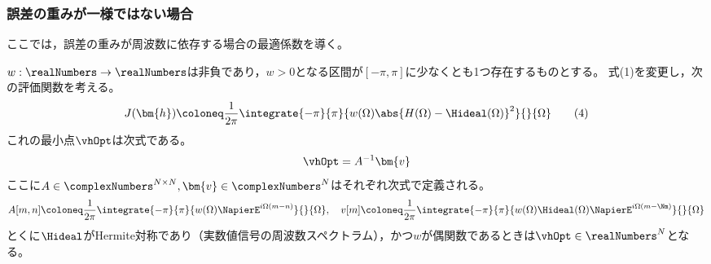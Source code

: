         \subsubsection{誤差の重みが一様ではない場合}
            ここでは，誤差の重みが周波数に依存する場合の最適係数を導く。
            \begin{shadebox}
                $w:\realNumbers\to\realNumbers$は非負であり，$w>0$となる区間が$[-\pi,\pi]$に少なくとも1つ存在するものとする。
                式(1)を変更し，次の評価関数を考える。
                \[ J(\bm{h}) \coloneq \frac{1}{2\pi}\integrate{-\pi}{\pi}{w(\Omega)\abs{H(\Omega)-\Hideal(\Omega)}^2}{}{\Omega}\tag{4} \]
                これの最小点$\vhOpt$は次式である。
                \[ \vhOpt = A^{-1}\bm{v} \]
                ここに$A\in\complexNumbers^{N\times N},\bm{v}\in\complexNumbers^N$はそれぞれ次式で定義される。
                \[ A[m,n] \coloneq \frac{1}{2\pi}\integrate{-\pi}{\pi}{w(\Omega)\NapierE^{i\Omega(m-n)}}{}{\Omega},\quad v[m] \coloneq \frac{1}{2\pi}\integrate{-\pi}{\pi}{w(\Omega)\Hideal(\Omega)\NapierE^{i\Omega (m-\Nm)}}{}{\Omega} \]
                とくに$\Hideal$がHermite対称であり（実数値信号の周波数スペクトラム），かつ$w$が偶関数であるときは$\vhOpt\in\realNumbers^N$となる。
            \end{shadebox}
